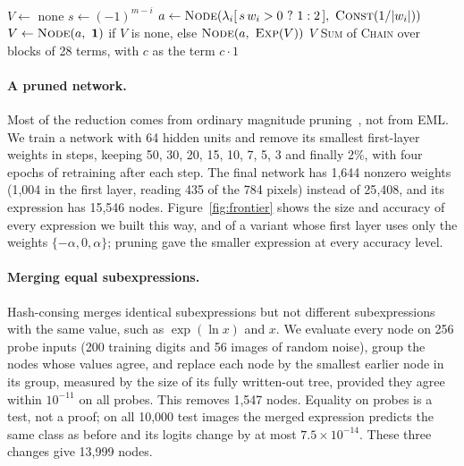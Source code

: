 \documentclass[11pt]{article}
\begin{document}
\begin{algorithm}[tb]
\caption{Compact weighted sum, replacing \textsc{Affine} of
Algorithm~\ref{alg:compile}. \textsc{Const}$(c)$ builds a positive constant from $\mathbf{1}$ as \textsc{LnConst} does; inputs enter as
$\lambda_i=(\ln\ln x_i,\ \ln\ln(-x_i))$.}
\label{alg:compact}
\small
\begin{algorithmic}[1]
 
  \State $V\gets$ none
    \State $s\gets(-1)^{m-i}$ 
    \State $a\gets\textsc{Node}(\lambda_i[\,s\,w_i>0\ ?\ 1:2\,],\ \textsc{Const}(1/|w_i|))$ 
    \State $V\gets\textsc{Node}(a,\ \mathbf{1})$ if $V$ is none, else $\textsc{Node}(a,\ \textsc{Exp}(V))$ 
  \EndFor
  \State \Return $V$
\EndFunction
{} \Return \textsc{Sum} of \textsc{Chain} over blocks of 28 terms, with $c$ as the term $c\cdot 1$ \EndFunction
\end{algorithmic}
\end{algorithm}

\paragraph{A pruned network.}
Most of the reduction comes from ordinary magnitude
pruning~\cite{lecun1990,han2015}, not from EML. We train a network with 64
hidden units and remove its smallest first-layer weights in steps, keeping
50, 30, 20, 15, 10, 7, 5, 3 and finally 2\%, with four epochs of retraining
after each step. The final network has 1{,}644 nonzero weights (1{,}004 in the
first layer, reading 435 of the 784 pixels) instead of 25{,}408, and its
expression has 15{,}546 nodes. Figure~\ref{fig:frontier} shows the size and
accuracy of every expression we built this way, and of a variant whose first
layer uses only the weights $\{-\alpha,0,\alpha\}$; pruning gave the smaller
expression at every accuracy level.

\paragraph{Merging equal subexpressions.}
Hash-consing merges identical subexpressions but not different
subexpressions with the same value, such as $\exp(\ln x)$ and $x$. We
evaluate every node on 256 probe inputs (200 training digits and 56 images of
random noise), group the nodes whose values agree, and replace each node by
the smallest earlier node in its group, measured by the size of its fully
written-out tree, provided they agree within $10^{-11}$ on all probes. This
removes 1{,}547 nodes. Equality on probes is a test, not a proof; on all
10{,}000 test images the merged expression predicts the same class as before
and its logits change by at most $7.5\times10^{-14}$.
These three changes give 13{,}999 nodes.
\end{document}
